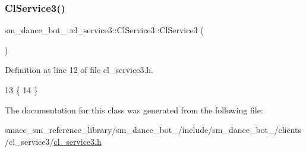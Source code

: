 \subsubsection{\texorpdfstring{Cl\+Service3()}{ClService3()}}
{\footnotesize\ttfamily sm\+\_\+dance\+\_\+bot\+\_\+::cl\+\_\+service3\+::\+Cl\+Service3\+::\+Cl\+Service3 (\begin{DoxyParamCaption}{ }\end{DoxyParamCaption})\hspace{0.3cm}{\ttfamily [inline]}}



Definition at line 12 of file cl\+\_\+service3.\+h.


\begin{DoxyCode}
13   \{
14   \}
\end{DoxyCode}


The documentation for this class was generated from the following file\+:\begin{DoxyCompactItemize}
\item 
smacc\+\_\+sm\+\_\+reference\+\_\+library/sm\+\_\+dance\+\_\+bot\+\_/include/sm\+\_\+dance\+\_\+bot\+\_/clients/cl\+\_\+service3/\hyperlink{sm__dance__bot__2_2include_2sm__dance__bot__2_2clients_2cl__service3_2cl__service3_8h}{cl\+\_\+service3.\+h}\end{DoxyCompactItemize}
